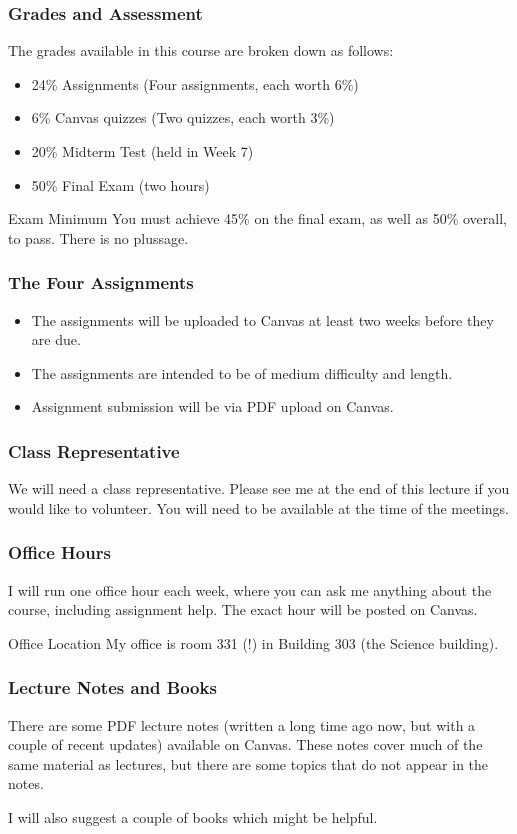 \documentclass{beamer}
\begin{document}
\begin{frame}
\frametitle{Grades and Assessment}
The grades available in this course are broken down as follows:\pause

\begin{itemize}
\item 24\% Assignments (Four assignments, each worth 6\%)\pause
\item 6\% Canvas quizzes (Two quizzes, each worth 3\%)\pause
\item 20\% Midterm Test (held in Week 7)\pause
\item 50\% Final Exam (two hours)\pause
\end{itemize}

\begin{alertblock}{Exam Minimum}
You must achieve 45\% on the final exam, as well as 50\% overall, to pass.
There is no plussage.
\end{alertblock}
\end{frame}


\begin{frame}
\frametitle{The Four Assignments}
\begin{itemize}
\item The assignments will be uploaded to Canvas at least two weeks before they
are due.
\item The assignments are intended to be of medium difficulty and length.
\item Assignment submission will be via PDF upload on Canvas.
\end{itemize}

\end{frame}




\begin{frame}
\frametitle{Class Representative}
We will need a class representative. Please see me at the end of this lecture
if you would like to volunteer. You will need to be available at the time of the
meetings.


\end{frame}


\begin{frame}
\frametitle{Office Hours}
I will run one office hour each week, where you can ask me anything about the
course, including assignment help. The exact hour will be posted on Canvas. \pause

\begin{alertblock}{Office Location}
My office is room 331 (!) in Building 303 (the Science building).
\end{alertblock}
\end{frame}


\begin{frame}
\frametitle{Lecture Notes and Books}
There are some PDF lecture notes (written a long time ago now, but with a
couple of recent updates) available on Canvas. These notes cover much of
the same material as lectures, but there are some topics that do not appear in
the notes.\\[1em] \pause

I will also suggest a couple of books which might be helpful.
\end{frame}
\end{document}
